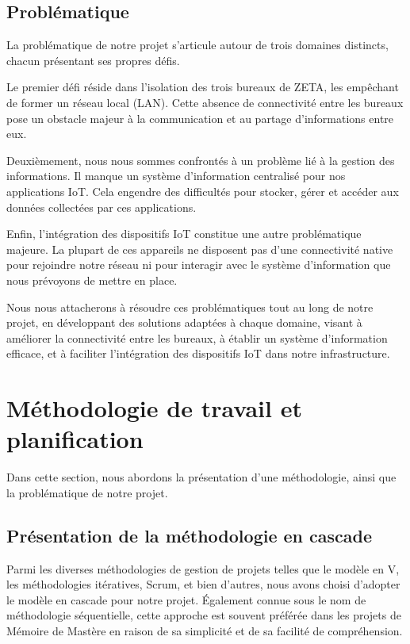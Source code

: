 \subsection{Problématique}
La problématique de notre projet s'articule autour de trois domaines distincts, chacun présentant ses propres défis.

Le premier défi réside dans l'isolation des trois bureaux de ZETA, les empêchant de former un réseau local (LAN). Cette absence de connectivité entre les bureaux pose un obstacle majeur à la communication et au partage d'informations entre eux.

Deuxièmement, nous nous sommes confrontés à un problème lié à la gestion des informations. Il manque un système d'information centralisé pour nos applications IoT. Cela engendre des difficultés pour stocker, gérer et accéder aux données collectées par ces applications.

Enfin, l'intégration des dispositifs IoT constitue une autre problématique majeure. La plupart de ces appareils ne disposent pas d'une connectivité native pour rejoindre notre réseau ni pour interagir avec le système d'information que nous prévoyons de mettre en place.

Nous nous attacherons à résoudre ces problématiques tout au long de notre projet, en développant des solutions adaptées à chaque domaine, visant à améliorer la connectivité entre les bureaux, à établir un système d'information efficace, et à faciliter l'intégration des dispositifs IoT dans notre infrastructure.

\section{Méthodologie de travail et planification}

Dans cette section, nous abordons la présentation d'une méthodologie, ainsi que la problématique de notre projet.


\subsection{Présentation de la méthodologie en cascade}

Parmi les diverses méthodologies de gestion de projets telles que le modèle en V, les méthodologies itératives, Scrum, et bien d'autres, nous avons choisi d'adopter le modèle en cascade pour notre projet. Également connue sous le nom de méthodologie séquentielle, cette approche est souvent préférée dans les projets de Mémoire de Mastère en raison de sa simplicité et de sa facilité de compréhension.

